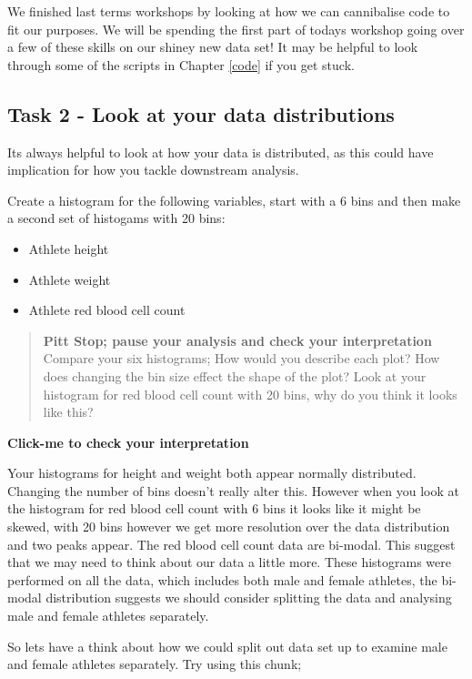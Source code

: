 \documentclass[
]{book}
\providecommand{\tightlist}{%
  \setlength{\itemsep}{0pt}\setlength{\parskip}{0pt}}
\begin{document}
We finished last terms workshops by looking at how we can cannibalise code to fit our purposes. We will be spending the first part of todays workshop going over a few of these skills on our shiney new data set! It may be helpful to look through some of the scripts in Chapter \ref{code} if you get stuck.

\subsection{Task 2 - Look at your data distributions}\label{task-2---look-at-your-data-distributions}

Its always helpful to look at how your data is distributed, as this could have implication for how you tackle downstream analysis.

Create a histogram for the following variables, start with a 6 bins and then make a second set of histogams with 20 bins:

\begin{itemize}
\tightlist
\item
  Athlete height
\item
  Athlete weight
\item
  Athlete red blood cell count
\end{itemize}

\begin{quote}
\textbf{Pitt Stop; pause your analysis and check your interpretation}
Compare your six histograms;
How would you describe each plot?
How does changing the bin size effect the shape of the plot?
Look at your histogram for red blood cell count with 20 bins, why do you think it looks like this?
\end{quote}

\textbf{Click-me to check your interpretation}

Your histograms for height and weight both appear normally distributed. Changing the number of bins doesn't really alter this. However when you look at the histogram for red blood cell count with 6 bins it looks like it might be skewed, with 20 bins however we get more resolution over the data distribution and two peaks appear. The red blood cell count data are bi-modal. This suggest that we may need to think about our data a little more. These histograms were performed on all the data, which includes both male and female athletes, the bi-modal distribution suggests we should consider splitting the data and analysing male and female athletes separately.

So lets have a think about how we could split out data set up to examine male and female athletes separately. Try using this chunk;
\end{document}

